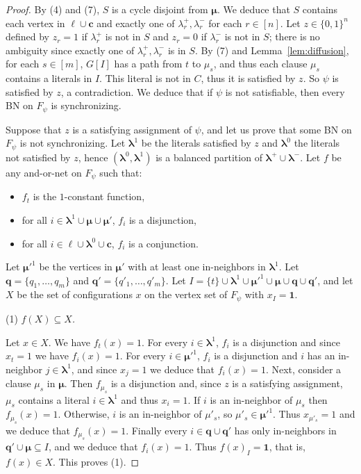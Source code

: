\documentclass[11pt,letter]{article}
\newcommand{\BF}[1]{{{\boldmath{\bf #1}\unboldmath}}}
\newcommand{\B}{\{0,1\}}
\newcommand{\ONE}{\mathbf{1}}
\newcommand{\q}{{\boldsymbol{q}}}
\newcommand{\LAMBDA}{\boldsymbol{\lambda}}
\newcommand{\MU}{\boldsymbol{\mu}}
\newcommand{\ELL}{\boldsymbol{\ell}}
\newcommand{\C}{\boldsymbol{c}}
\begin{document}
\begin{proof}
\bigskip
By (4) and (7), $S$ is a cycle disjoint from $\MU$. We deduce that $S$ contains each vertex in $\ELL\cup\C$ and exactly one of $\lambda^+_r,\lambda^-_r$ for each $r\in [n]$. Let $z\in\B^n$ defined by $z_r=1$ if $\lambda^+_r$ is not in $S$ and $z_r=0$ if $\lambda^-_r$ is not in $S$; there is no ambiguity since exactly one of $\lambda^+_r,\lambda^-_r$ is in $S$. By (7) and Lemma~\ref{lem:diffusion}, for each $s\in [m]$, $G[I]$ has a path from $t$ to $\mu_s$, and thus each clause $\mu_s$ contains a literals in $I$. This literal is not in $C$, thus it is satisfied by $z$. So $\psi$ is satisfied by $z$, a contradiction. We deduce that if $\psi$ is not satisfiable, then every BN on $F_\psi$ is synchronizing. 

\bigskip
\noindent
\BF{($2 \Rightarrow 1$)} Suppose that $z$ is a satisfying assignment of $\psi$, and let us prove that some BN on $F_\psi$ is not synchronizing. Let $\LAMBDA^1$ be the literals satisfied by $z$ and $\LAMBDA^0$ the literals not satisfied by $z$, hence $(\LAMBDA^0,\LAMBDA^1)$ is a balanced partition of $\LAMBDA^+\cup\LAMBDA^-$. Let $f$ be any and-or-net on $F_\psi$ such that:
\begin{itemize}
\item
$f_t$ is the $1$-constant function,
\item
for all $i\in\LAMBDA^1\cup\MU\cup\MU'$, $f_i$ is a disjunction,
\item
for all $i\in \ELL\cup\LAMBDA^0\cup \C$, $f_i$ is a conjunction.
\end{itemize}

\medskip
Let $\MU'^1$ be the vertices in $\MU'$ with at least one in-neighbors in $\LAMBDA^1$. Let $\q=\{q_1,\dots,q_m\}$ and $\q'=\{q'_1,\dots,q'_m\}$. Let $I=\{t\}\cup \LAMBDA^1\cup\MU'^1\cup \MU\cup\q\cup\q'$, and let $X$ be the set of configurations $x$ on the vertex set of $F_\psi$ with $x_I=\ONE$.

\bigskip
\noindent
(1) {\em $f(X)\subseteq X$.}

\medskip
\noindent
Let $x\in X$. We have $f_t(x)=1$. For every $i\in\LAMBDA^1$, $f_i$ is a disjunction and since $x_t=1$ we have $f_i(x)=1$. For every $i\in\MU'^1$, $f_i$ is a disjunction and $i$ has an in-neighbor $j\in\LAMBDA^1$, and since $x_j=1$ we deduce that $f_i(x)=1$. Next, consider a clause $\mu_s$ in $\MU$. Then $f_{\mu_s}$ is a disjunction and, since $z$ is a satisfying assignment, $\mu_s$ contains a literal $i\in\LAMBDA^1$ and thus $x_i=1$. If $i$ is an in-neighbor of $\mu_s$ then $f_{\mu_s}(x)=1$. Otherwise, $i$ is an in-neighbor of $\mu'_s$, so $\mu'_s\in\MU'^1$. Thus $x_{\mu'_s}=1$ and we deduce that $f_{\mu_s}(x)=1$. Finally every $i\in\q\cup \q'$ has only in-neighbors in $\q'\cup\MU\subseteq I$, and we deduce that $f_i(x)=1$. Thus $f(x)_I=\ONE$, that is, $f(x)\in X$. This proves (1). 


\end{proof}
\end{document}
